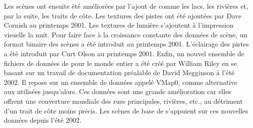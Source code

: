 \begin{itemize}
{\item Les sc\`{e}nes ont ensuite \'{e}t\'{e} am\'{e}lior\'{e}es par l'ajout de  comme les lacs, les rivi\`{e}res et, par la suite, les traits de c\^{o}te. Les textures des pistes ont \'{e}t\'{e} ajout\'{e}es par Dave Cornish au printemps 2001. Les textures de lumi\`{e}re s'ajoutent \`{a} l'impression visuelle la nuit. Pour faire face \`{a} la croissance constante des donn\'{e}es de sc\`{e}ne, un format binaire des sc\`{e}nes a \'{e}t\'{e} introduit au printemps 2001. L'\'{e}clairage des pistes a \'{e}t\'{e} introduit par Curt Olson au printemps 2001. Enfin, un nouvel ensemble de fichiers de donn\'{e}es de  pour le monde entier a \'{e}t\'{e} cr\'{e}\'{e} par William Riley en se basant sur un travail de documentation pr\'{e}alable de David Megginson \`{a} l'\'{e}t\'{e} 2002. Il repose sur un ensemble de donn\'{e}es appel\'{e} VMap0, comme alternative aux  utilis\'{e}es jusqu'alors. Ces donn\'{e}es sont une grande am\'{e}lioration car elles offrent une couverture mondiale des rues principales, rivi\`{e}res, etc., au d\'{e}triment d'un trait de c\^{o}te moins pr\'{e}cis. Les sc\`{e}nes de base de \FlightGear{} s'appuient sur ces nouvelles donn\'{e}es depuis l'\'{e}t\'{e} 2002.
}{}
\fi
 \medskip


\end{itemize}
